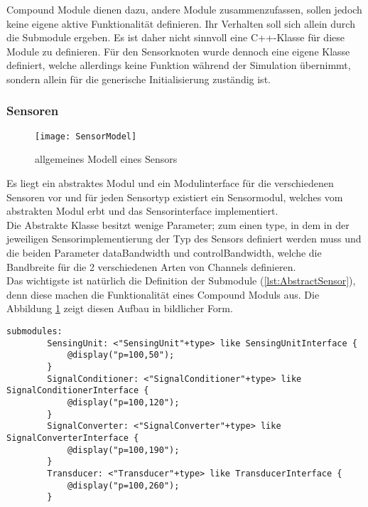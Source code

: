 Compound Module dienen dazu, andere Module zusammenzufassen, sollen jedoch keine eigene aktive Funktionalität definieren. Ihr Verhalten soll sich allein durch die Submodule ergeben. Es ist daher nicht sinnvoll eine C++-Klasse für diese Module zu definieren.\newline
Für den Sensorknoten wurde dennoch eine eigene Klasse definiert, welche allerdings keine Funktion während der Simulation übernimmt, sondern allein für die generische Initialisierung zuständig ist.

\subsubsection{Sensoren}

\begin{figure}[htbp]
\centering
\caption{allgemeines Modell eines Sensors}
\label{fig:SensorModel}
\texttt{[image: SensorModel]}
\end{figure}

Es liegt ein abstraktes Modul und ein Modulinterface für die verschiedenen Sensoren vor und für jeden Sensortyp existiert ein Sensormodul, welches vom abstrakten Modul erbt und das Sensorinterface implementiert.\\
Die Abstrakte Klasse besitzt wenige Parameter; zum einen type, in dem in der jeweiligen Sensorimplementierung der Typ des Sensors definiert werden muss und die beiden Parameter dataBandwidth und controlBandwidth, welche die Bandbreite für die 2 verschiedenen Arten von Channels definieren.\\
Das wichtigste ist natürlich die Definition der Submodule (\ref{lst:AbstractSensor}), denn diese machen die Funktionalität eines Compound Moduls aus. Die Abbildung \ref{fig:SensorModel} zeigt diesen Aufbau in bildlicher Form.

\begin{lstlisting}[language=ned,caption={AbstractSensor},label=lst:AbstractSensor]
submodules:
        SensingUnit: <"SensingUnit"+type> like SensingUnitInterface {
            @display("p=100,50");
        }
        SignalConditioner: <"SignalConditioner"+type> like SignalConditionerInterface {
            @display("p=100,120");
        }
        SignalConverter: <"SignalConverter"+type> like SignalConverterInterface {
            @display("p=100,190");
        }
        Transducer: <"Transducer"+type> like TransducerInterface {
            @display("p=100,260");
        }
\end{lstlisting}

